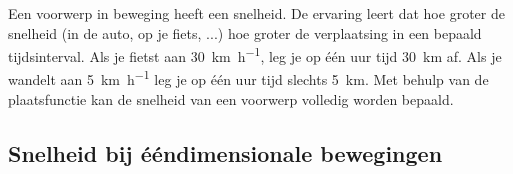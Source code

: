 \documentclass{ximera}
\begin{document}
	\author{Bart Lambregs,Vincent Gellens}
    \xmsource\xmuitleg





Een voorwerp in beweging heeft een snelheid. 
De ervaring leert dat hoe groter de snelheid (in de auto, op je fiets, ...) hoe groter de verplaatsing in een bepaald tijdsinterval. 
Als je fietst aan \SI{30}{\kilo\meter\per\hour}, leg je op één uur tijd \SI{30}{km} af. 
Als je wandelt aan \SI{5}{\kilo\meter\per\hour} leg je op één uur tijd slechts \SI{5}{km}. 
Met behulp van de plaatsfunctie kan de snelheid van een voorwerp volledig worden bepaald. 





\subsection*{Snelheid bij ééndimensionale bewegingen}

\end{document}
